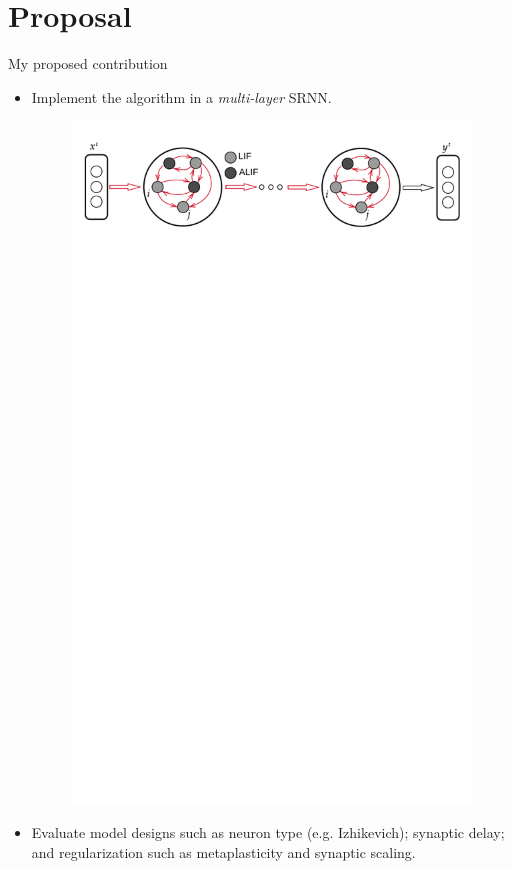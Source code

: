 \documentclass[t]{beamer}
\begin{document}
\section{Proposal}
\begin{frame}{My proposed contribution}
\begin{itemize}[label=--]
\item Implement the algorithm in a \emph{multi-layer} SRNN.
	\begin{figure}[!ht]
		\includegraphics[clip, trim=0cm 25cm 0cm 0cm, width=0.667\linewidth]{BellecDiagramML.pdf}  %
	\end{figure}
\item Evaluate model designs such as neuron type (e.g. Izhikevich); synaptic delay; and regularization such as metaplasticity and synaptic scaling.
\end{itemize}

\end{frame}
\end{document}
